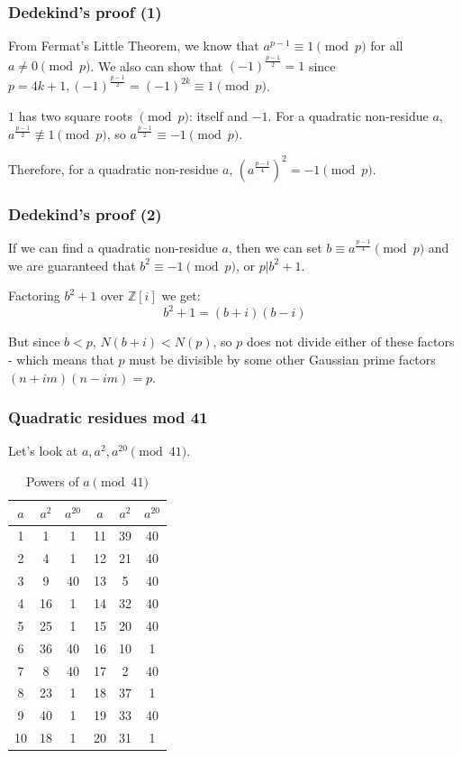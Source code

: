 \documentclass{beamer}
\begin{document}
\begin{frame}
	\frametitle{Dedekind's proof (1)}

	From Fermat's Little Theorem, we know that $a^{p-1} \equiv 1 \pmod{p}$ for all
	$a\neq 0 \pmod{p}$. We also can show that $(-1)^{\frac{p-1}{2}} = 1$ since 
	$p = 4k+1, (-1)^{\frac{p-1}{2}} = (-1)^{2k} \equiv 1 \pmod{p}$.

	$1$ has two square roots $\pmod{p}$: itself and $-1$. For a quadratic non-residue $a$,
	$a^{\frac{p-1}{2}} \not \equiv 1 \pmod{p}$, so $a^{\frac{p-1}{2}} \equiv -1 \pmod{p}$.

	Therefore, for a quadratic non-residue $a$, $(a^{\frac{p-1}{4}})^2 = -1 \pmod{p}$.

\end{frame}

\begin{frame}
	\frametitle{Dedekind's proof (2)}

	If we can find a quadratic non-residue $a$, then we can set $b \equiv a^{\frac{p-1}{4}} \pmod{p}$
	and we are guaranteed that $b^2 \equiv -1 \pmod{p}$, or $p | b^2+1$.

	Factoring $b^2+1$ over $\mathbb{Z}[i]$ we get:
	\[b^2 + 1 = (b+i)(b-i) \]
	
	But since $b<p$, $N(b+i)<N(p)$, so $p$ does not divide either of these factors - which means
	that $p$ must be divisible by some other Gaussian prime factors $(n+im)(n-im) = p$.
\end{frame}

\begin{frame}
	\frametitle{Quadratic residues mod 41}

	Let's look at $a,a^2, a^{20} \pmod{41}$.

       \begin{table}
\begin{tabular}{| c | c | c || c | c | c ||}
        \hline
	$a$ & $a^2$ & $a^{20}$ & $a$ & $a^2$ & $a^{20}$ \\
	\hline
	1  & 1  & 1  & 11 & 39 & 40 \\
	2  & 4  & 1  & 12 & 21 & 40 \\
	3  & 9  & 40 & 13 & 5  & 40 \\
	4  & 16 & 1  & 14 & 32 & 40 \\
	5  & 25 & 1  & 15 & 20 & 40 \\
	6  & 36 & 40 & 16 & 10 & 1  \\
	7  & 8  & 40 & 17 & 2 & 40 \\
	8  & 23 & 1  & 18 & 37 & 1  \\
	9  & 40 & 1  & 19 & 33 & 40 \\
	10 & 18 & 1  & 20 & 31 & 1  \\
	\hline
\end{tabular}
	       \caption*{Powers of $a \pmod{41}$}
\end{table}

\end{frame}
\end{document}
